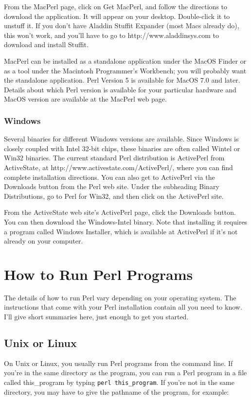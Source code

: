 From the MacPerl page, click on Get MacPerl, and follow the directions to download the application. It will appear on your desktop.  Double-click it to unstuff it. If you don't have Aladdin Stuffit Expander (most Macs already do), this won't work, and you'll have to go to http://www.aladdinsys.com to download and install Stuffit.

MacPerl can be installed as a standalone application under the MacOS Finder or as a tool under the Macintosh Programmer's Workbench; you will probably want the standalone application. Perl Version 5 is available for MacOS 7.0 and later. Details about which Perl version is available for your particular hardware and MacOS version are available at the MacPerl web page.

\subsubsection{Windows}
Several binaries for different Windows versions are available. Since Windows is closely coupled with Intel 32-bit chips, these binaries are often called Wintel or Win32 binaries. The current standard Perl distribution is ActivePerl from ActiveState, at http://www.activestate.com/ActivePerl/, where you can find complete installation directions. You can also get to ActivePerl via the Downloads button from the Perl web site. Under the subheading Binary Distributions, go to Perl for Win32, and then click on the ActivePerl site.

From the ActiveState web site's ActivePerl page, click the Downloads button. You can then download the Windows-Intel binary. Note that installing it requires a program called Windows Installer, which is available at ActivePerl if it's not already on your computer. 

\section{How to Run Perl Programs}
The details of how to run Perl vary depending on your operating system.  The instructions that come with your Perl installation contain all you need to know. I'll give short summaries here, just enough to get you started.

\subsection{Unix or Linux}
On Unix or Linux, you usually run Perl programs from the command line.  If you're in the same directory as the program, you can run a Perl program in a file called this\_program by typing \verb|perl this_program|. If you're not in the same directory, you may have to give the pathname of the program, for example:

